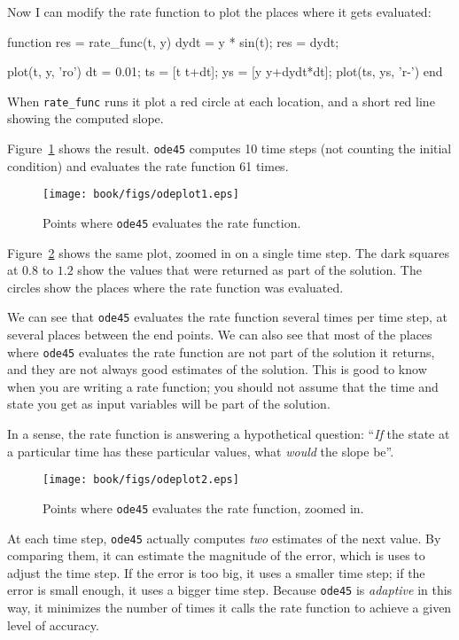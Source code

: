 
Now I can modify the rate function to plot the places where it gets evaluated:

\begin{code}
function res = rate_func(t, y)
    dydt = y * sin(t);
    res = dydt;

    plot(t, y, 'ro')
    dt = 0.01;
    ts = [t t+dt];
    ys = [y y+dydt*dt];
    plot(ts, ys, 'r-')
end
\end{code}

When \verb"rate_func" runs it plot a red circle at each location, and a short red line showing the computed slope.


Figure~\ref{fig:odeplot1} shows the result.  {\tt ode45} computes 10 time steps (not counting the initial condition) and evaluates the rate function 61 times.

\begin{figure}
\centerline{\texttt{[image: book/figs/odeplot1.eps]}}
\caption{Points where {\tt ode45} evaluates the rate function.}
\label{fig:odeplot1}
\end{figure}

Figure~\ref{fig:odeplot2} shows the same plot, zoomed in on a single time step.  
The dark squares at $0.8$ to $1.2$ show the values that were returned as part of the solution.
The circles show the places where the rate function was evaluated.

We can see that {\tt ode45} evaluates the rate function several times per time step, at several places between the end points.  
We can also see that most of the places where {\tt ode45} evaluates the rate function are not part of the solution it returns, and they are not always good estimates of the solution.
This is good to know when you are writing a rate function; you should not assume that the time and state you get as input variables will be part of the solution.

In a sense, the rate function is answering a hypothetical question: ``{\em If} the state at a particular time has these particular values, what {\em would} the slope be''.

\begin{figure}
\centerline{\texttt{[image: book/figs/odeplot2.eps]}}
\caption{Points where {\tt ode45} evaluates the rate function, zoomed in.}
\label{fig:odeplot2}
\end{figure}

At each time step, {\tt ode45} actually computes {\em two} estimates of the next value.
By comparing them, it can estimate the magnitude of the error, which is uses to adjust the time step.
If the error is too big, it uses a smaller time step; if the error is small enough, it uses a bigger time step.
Because {\tt ode45} is \emph{adaptive} in this way, it minimizes the number of times it calls the rate function to achieve a given level of accuracy.

